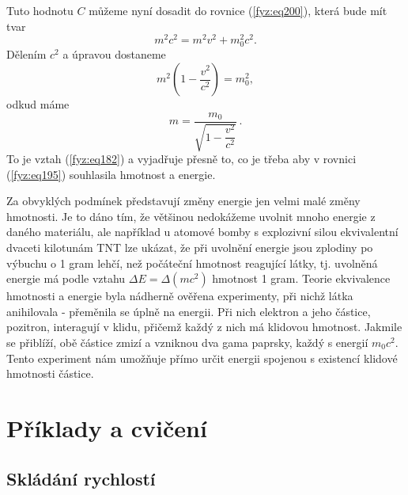     Tuto hodnotu \(C\) můžeme nyní dosadit do rovnice (\ref{fyz:eq200}), která bude mít tvar
    \begin{equation}\label{fyz:eq202}
      m^2c^2 = m^2v^2 + m_0^2c^2.
    \end{equation}
    Dělením \(c^2\) a úpravou dostaneme
    \begin{equation*}
      m^2\left(1-\dfrac{v^2}{c^2}\right) = m_0^2,
    \end{equation*}
    odkud máme
    \begin{equation}\label{fyz:eq203}
      \boxed{m = \dfrac{m_0}{\sqrt{1-\dfrac{v^2}{c^2}}}}\,.
    \end{equation}
    To je vztah (\ref{fyz:eq182}) a vyjadřuje přesně to, co je třeba aby v rovnici 
    (\ref{fyz:eq195}) souhlasila hmotnost a energie.
    
    Za obvyklých podmínek představují změny energie jen velmi malé změny hmotnosti. Je to dáno tím, 
    že většinou nedokážeme uvolnit mnoho energie z daného materiálu, ale například u atomové bomby 
    s explozivní silou ekvivalentní dvaceti kilotunám TNT lze ukázat, že při uvolnění energie jsou 
    zplodiny po výbuchu o \num{1} gram lehčí, než počáteční hmotnost reagující látky, tj. uvolněná 
    energie má podle vztahu \(\Delta E=\Delta(mc^2)\) hmotnost \num{1} gram. Teorie ekvivalence 
    hmotnosti a energie byla nádherně ověřena experimenty, při nichž látka anihilovala - přeměnila 
    se úplně na energii. Při nich elektron a jeho částice, pozitron, interagují v klidu, přičemž 
    každý z nich má klidovou hmotnost. Jakmile se přiblíží, obě částice zmizí a vzniknou dva gama 
    paprsky, každý s energií \(m_0c^2\). Tento experiment nám umožňuje přímo určit energii spojenou 
    s existencí klidové hmotnosti částice.
    
    
  \section{Příklady a cvičení}\label{fyz:IchapXVsecXII}
    \subsection{Skládání rychlostí}
      

